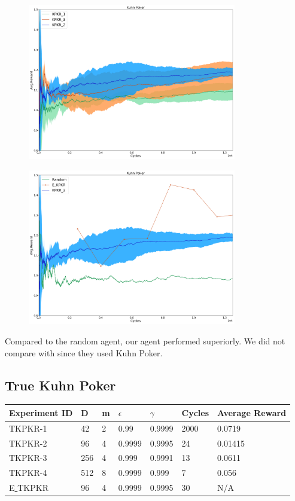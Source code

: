 \documentclass{article}
\theoremstyle{definition}
\newtheorem{primary statistics}[definition]{Primary Statistics}
\newtheorem{auxiliary statistics}[definition]{Auxiliary Statistics}
\begin{document}
 \begin{figure}[h]
 \centering
    \includegraphics[width=9.1cm]{4_Kuhn_Poker}
\end{figure}

 \begin{figure}[h]
 \centering
    \includegraphics[width=9.1cm]{Kuhn_Poker}
\end{figure}

Compared to the random agent, our agent performed superiorly. We did not compare with \citep{veness2011monte} since they used Kuhn Poker.

\newpage

\subsection{True Kuhn Poker}
\begin{tabular}{|l|l|l|l|l|l|l|}
\hline \centering
 Experiment ID& D & m & $\epsilon$ & $\gamma$ & Cycles & Average Reward \\ \hline
TKPKR-1  & 42        & 2           & 0.99        & 0.9999            & 2000   & 0.0719        \\ \hline
TKPKR-2  & 96        & 4           & 0.9999      & 0.9995            & 24     & 0.01415         \\ \hline
TKPKR-3  & 256       & 4           & 0.999       & 0.9991            & 13     & 0.0611         \\ \hline
TKPKR-4  & 512       & 8           & 0.9999      & 0.999             & 7      & 0.056      \\ \hline 
E\underline{ }TKPKR  & 96       & 4           & 0.9999      & 0.9995             & 30      & N/A      \\ \hline        
\end{tabular} 
\end{document}
